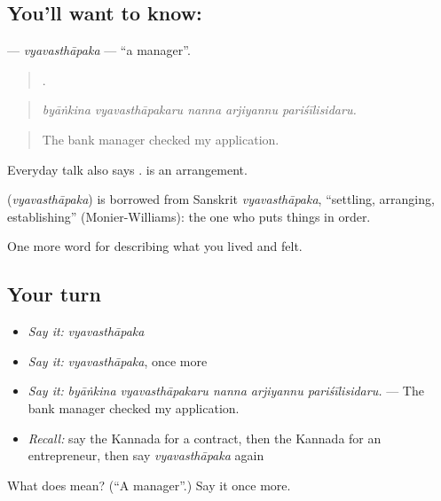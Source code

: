 \subsection*{You'll want to know: }
\textbf{} — \emph{vyavasthāpaka} — \textquotedblleft{}a manager\textquotedblright{}.

\begin{quote}
    .
\end{quote}

\begin{quote}
\emph{byāṅkina vyavasthāpakaru nanna arjiyannu pariśīlisidaru.}
\end{quote}

\begin{quote}
The bank manager checked my application.
\end{quote}

Everyday talk also says .  is an arrangement.

\begin{cousinweb}
\textbf{} (\emph{vyavasthāpaka}) is borrowed from Sanskrit \emph{vyavasthāpaka}, \textquotedblleft{}settling, arranging, establishing\textquotedblright{} (Monier-Williams): the one who puts things in order.
\end{cousinweb}

\begin{grammarlens}[title={What you've built}]
One more word for describing what you lived and felt.
\end{grammarlens}

\subsection*{Your turn}
\begin{itemize}
\raggedright
  \item \emph{Say it:} \emph{vyavasthāpaka}
  \item \emph{Say it:} \emph{vyavasthāpaka}, once more
  \item \emph{Say it:} \emph{byāṅkina vyavasthāpakaru nanna arjiyannu pariśīlisidaru.} — The bank manager checked my application.
  \item \emph{Recall:} say the Kannada for a contract, then the Kannada for an entrepreneur, then say \emph{vyavasthāpaka} again
\end{itemize}

\begin{tcolorbox}[breakable,colback=teal!4,colframe=teal!35!black,title={Before you move on}]
What does  mean? (\textquotedblleft{}A manager\textquotedblright{}.) Say it once more.
\end{tcolorbox}
